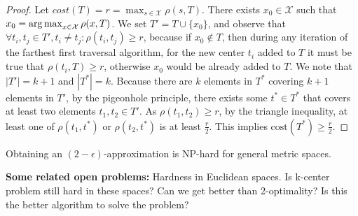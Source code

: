 \begin{proof}
Let $ cost(T) = r = \max_{s \in \mathcal{X}} \rho(s,T) $. There exists
$x_0 \in \mathcal{X}$ such that $x_0 = \operatorname*{\mathrm{arg\,max}}_{x \in\mathcal{X}}
\rho(x,T)$. We set $T' = T \cup \{x_0\} $, and observe that $\forall
t_i, t_j \in T', t_i \ne t_j : \rho(t_i,t_j) \ge r$, because if $x_0
\notin T$, then during any iteration of the farthest first traversal
algorithm, for the new center $t_i$ added to $T$ it must be true that
$\rho(t_i, T) \geq r$, otherwise $x_0$ would be already added to $T$.
We note that $|T'| = k+1$ and $ |T^*| = k$. Because there are $k$
elements in $T^*$ covering $k+1$ elements in $T'$, by the pigeonhole
principle, there exists some $t^* \in T^*$ that covers at least two
elements $t_1,t_2 \in T'$. As $\rho(t_1,t_2) \geq r$, by the triangle
inequality, at least one of $\rho(t_1,t^*)$ or $\rho(t_2,t^*)$ is at
least $\frac{r}{2}$. This implies $\mathrm{cost}(T^*)\geq\frac{r}{2}$.
\end{proof}

\begin{remark}
Obtaining an $(2 - \epsilon)$-approximation is NP-hard for general
metric spaces.
\end{remark}

\noindent\textbf{Some related open problems:} Hardness in Euclidean
spaces. Is k-center problem still hard in these spaces? Can we get
better than 2-optimality? Is this the better algorithm to solve the
problem? 
